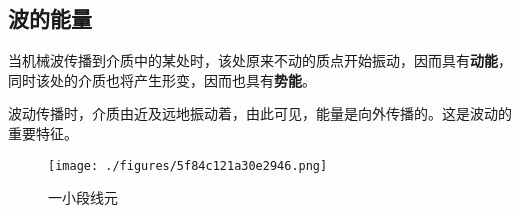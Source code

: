 

\subsection{波的能量}
当机械波传播到介质中的某处时，该处原来不动的质点开始振动，因而具有\textbf{动能}，同时该处的介质也将产生形变，因而也具有\textbf{势能}。

波动传播时，介质由近及远地振动着，由此可见，能量是向外传播的。这是波动的重要特征。

\begin{figure}[ht]
\centering
\texttt{[image: ./figures/5f84c121a30e2946.png]}
\caption{一小段线元} \label{fig_WaEner_1}
\end{figure}

